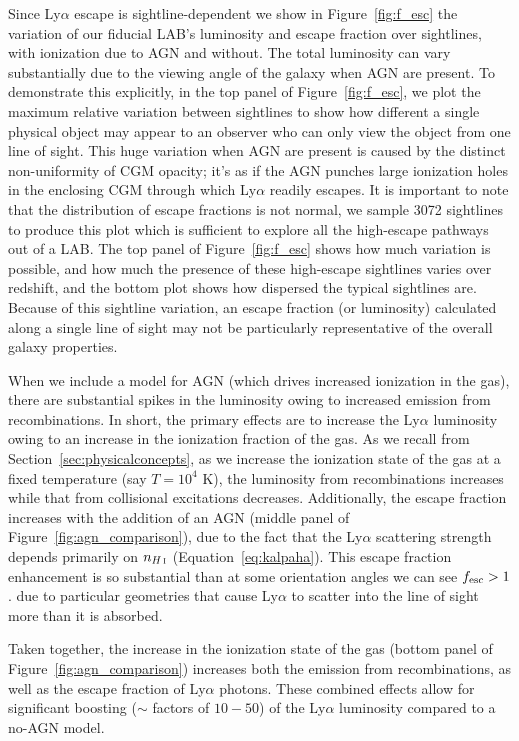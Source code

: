Since Ly$\alpha$ escape is sightline-dependent we show in Figure~\ref{fig:f_esc} the variation of our fiducial LAB's luminosity and escape fraction over sightlines, with ionization due to AGN and without.
The total luminosity can vary substantially due to the viewing angle of the galaxy when AGN are present.
To demonstrate this explicitly, in the top panel of Figure~\ref{fig:f_esc}, we plot the maximum relative variation between sightlines to show how different a single physical object may appear to an observer who can only view the object from one line of sight.
This huge variation when AGN are present is caused by the distinct non-uniformity of CGM opacity; it's as if the AGN punches large ionization holes in the enclosing CGM through which Ly$\alpha$ readily escapes.
It is important to note that the distribution of escape fractions is not normal, we sample 3072 sightlines to produce this plot which is sufficient to explore all the high-escape pathways out of a LAB.
The top panel of Figure~\ref{fig:f_esc} shows how much variation is possible, and how much the presence of these high-escape sightlines varies over redshift, and the bottom plot shows how dispersed the typical sightlines are.
Because of this sightline variation, an escape fraction (or luminosity) calculated along a single line of sight may not be particularly representative of the overall galaxy properties.

When we include a model for AGN (which drives increased ionization in the gas), there are substantial spikes in the luminosity owing to increased emission from recombinations.  In short, the primary effects are to increase the Ly$\alpha$ luminosity owing to an increase in the ionization fraction of the gas.  As we recall from Section~\ref{sec:physicalconcepts}, as we increase the ionization state of the gas at a fixed temperature (say $T=10^4$ K), the  luminosity from recombinations increases while that from collisional excitations decreases.  Additionally, the escape fraction increases with the addition of an AGN (middle panel of Figure~\ref{fig:agn_comparison}), due to the fact that the Ly$\alpha$ scattering strength depends primarily on $n_{{H\,\textsc{i}}}$ (Equation~\ref{eq:kalpaha}).   This escape fraction enhancement is so substantial than at some orientation angles we can see $f_{\rm esc} > 1$.   due to particular geometries that cause Ly$\alpha$ to scatter into the line of sight more than it is absorbed.

Taken together, the increase in the ionization state of the gas (bottom panel of Figure~\ref{fig:agn_comparison}) increases both the emission from recombinations, as well as the escape fraction of Ly$\alpha$ photons. These combined effects allow for significant boosting ($\sim$ factors of $10-50$) of the Ly$\alpha$ luminosity compared to a no-AGN model.

